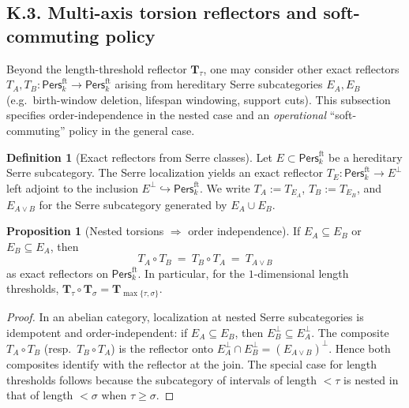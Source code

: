 \documentclass[11pt]{article}
\numberwithin{equation}{section}
\theoremstyle{plain}
\theoremstyle{definition}
\theoremstyle{remark}
\DeclareRobustCommand{\hyp}{\nobreakdash-}
\newcommand{\Pers}{\mathsf{Pers}}
\theoremstyle{plain}
\theoremstyle{definition}
\numberwithin{equation}{section}
\newtheorem{proposition}[theorem]{Proposition}
\theoremstyle{definition}
\newtheorem{definition}[theorem]{Definition}
\numberwithin{equation}{section}
\theoremstyle{plain}
\theoremstyle{definition}
\theoremstyle{remark}
\begin{document}
\subsection*{K.3. Multi-axis torsion reflectors and soft-commuting policy}
Beyond the length\hyp threshold reflector \( \mathbf{T}_\tau \), one may consider other exact reflectors \(T_A,T_B:\Pers^{\mathrm{ft}}_k\to\Pers^{\mathrm{ft}}_k\) arising from hereditary Serre subcategories \(E_A,E_B\) (e.g.\ birth\hyp window deletion, lifespan windowing, support cuts). This subsection specifies order\hyp independence in the nested case and an \emph{operational} ``soft\hyp commuting'' policy in the general case.

\begin{definition}[Exact reflectors from Serre classes]\label{K:def:serre-reflectors}
Let \(E\subset \Pers^{\mathrm{ft}}_k\) be a hereditary Serre subcategory. The Serre localization yields an exact reflector \(T_E:\Pers^{\mathrm{ft}}_k\to E^\perp\) left adjoint to the inclusion \(E^\perp\hookrightarrow \Pers^{\mathrm{ft}}_k\). We write \(T_A:=T_{E_A}\), \(T_B:=T_{E_B}\), and \(E_{A\vee B}\) for the Serre subcategory generated by \(E_A\cup E_B\).
\end{definition}

\begin{proposition}[Nested torsions \(\Rightarrow\) order independence]\label{K:prop:nested}
If \(E_A\subseteq E_B\) or \(E_B\subseteq E_A\), then
\[
T_A\circ T_B\ =\ T_B\circ T_A\ =\ T_{A\vee B}
\]
as exact reflectors on \(\Pers^{\mathrm{ft}}_k\).
In particular, for the \(1\)\hyp dimensional length thresholds, \(\mathbf{T}_\tau\circ \mathbf{T}_\sigma=\mathbf{T}_{\max\{\tau,\sigma\}}\).
\end{proposition}

\begin{proof}
In an abelian category, localization at nested Serre subcategories is idempotent and order\hyp independent: if \(E_A\subseteq E_B\), then \(E_B^\perp\subseteq E_A^\perp\). The composite \(T_A\circ T_B\) (resp.\ \(T_B\circ T_A\)) is the reflector onto \(E_A^\perp\cap E_B^\perp=(E_{A\vee B})^\perp\). Hence both composites identify with the reflector at the join. The special case for length thresholds follows because the subcategory of intervals of length \(<\tau\) is nested in that of length \(<\sigma\) when \(\tau\ge \sigma\).
\end{proof}
\end{document}
